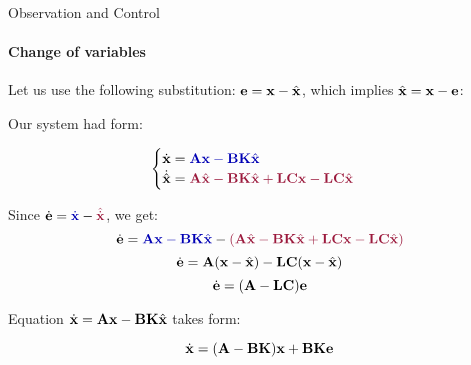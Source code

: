 \documentclass{beamer}
\begin{document}
\begin{frame}{Observation and Control}
\framesubtitle{Change of variables}
\begin{flushleft}

Let us use the following substitution: $\mathbf{e} = \mathbf{x} - \hat{\mathbf{x}}$, which implies $\hat{\mathbf{x}} = \mathbf{x} - \mathbf{e}$:

Our system had form:

\begin{equation}
\begin{cases}
\dot {\bo{x}} = \textcolor{mydarkblue}{\bo{A} \bo{x} - \bo{B}\bo{K} \hat{\bo{x}}} \\
\dot{\hat{\bo{x}}}  = \textcolor{mydarkpink}{\bo{A} \hat{\bo{x}} - \bo{B}\bo{K} \hat{\bo{x}} + \bo{L}\bo{C} \bo{x} - \bo{L}\bo{C} \hat{\bo{x}}}
\end{cases}
\end{equation}

Since $\dot{\bo{e}} = \textcolor{mydarkblue}{\dot{\bo{x}}} - \textcolor{mydarkpink}{\hat{\dot{\bo{x}}}}$, we get:
%
\[
\dot{\bo{e}} = 
\textcolor{mydarkblue}{\bo{A} \bo{x} - \bo{B}\bo{K} \hat{\bo{x}}} - 
\textcolor{mydarkpink}{(\bo{A} \hat{\bo{x}} - \bo{B}\bo{K} \hat{\bo{x}} + \bo{L}\bo{C} \bo{x} - \bo{L}\bo{C} \hat{\bo{x}})}
\]
%
\[
\dot{\mathbf{e}} = 
\mathbf{A} (\mathbf{x} - \hat{\mathbf{x}})  - \mathbf{L}\mathbf{C}(\mathbf{x} - \hat{\mathbf{x}})
\]
%
\[
\dot{\mathbf{e}} = 
(\mathbf{A}  - \mathbf{L}\mathbf{C})\mathbf{e}
\]

Equation $\dot {\mathbf{x}} = \mathbf{A} \mathbf{x} - \mathbf{B}\mathbf{K} \hat{\mathbf{x}}$ takes form:

\[
\dot {\mathbf{x}} = (\mathbf{A}-\mathbf{B}\mathbf{K}) \mathbf{x} +  \mathbf{B}\mathbf{K}\mathbf{e}
\]


\end{flushleft}
\end{frame}
\end{document}

